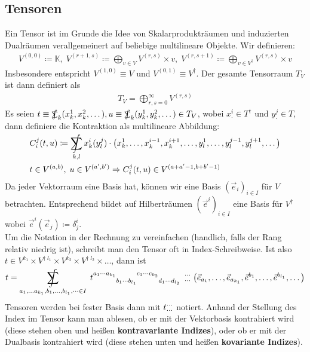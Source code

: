 \documentclass[12pt]{article}
\DeclareMathOperator*{\sumint}{%
	\mathchoice%
	{\ooalign{$\displaystyle\sum$\cr\hidewidth$\displaystyle\int$\hidewidth\cr}}
	{\ooalign{\raisebox{.14\height}{\scalebox{.7}{$\textstyle\sum$}}\cr\hidewidth$\textstyle\int$\hidewidth\cr}}
	{\ooalign{\raisebox{.2\height}{\scalebox{.6}{$\scriptstyle\sum$}}\cr$\scriptstyle\int$\cr}}
	{\ooalign{\raisebox{.2\height}{\scalebox{.6}{$\scriptstyle\sum$}}\cr$\scriptstyle\int$\cr}}
}
\begin{document}
\subsection{Tensoren}
Ein Tensor ist im Grunde die Idee von Skalarprodukträumen und induzierten Dualräumen verallgemeinert auf beliebige multilineare Objekte. Wir definieren:
\begin{align}
V^{(0, 0)} \coloneqq \mathbb K,\;  V^{(r+1, s)} \coloneqq \bigoplus_{v\in V} V^{(r, s)} \times v,\; V^{(r, s+1)} \coloneqq \bigoplus_{v\in V^\dagger} V^{(r, s)} \times v
\end{align}
Insbesondere entspricht $V^{(1, 0)} \equiv V$ und $V^{(0, 1)} \equiv V^\dagger$. Der gesamte Tensorraum $T_V$ ist dann definiert als
\begin{align}
T_V = \bigoplus_{r,s = 0}^\infty V^{(r, s)}
\end{align}
Es seien $t\equiv \sumint_k (x^1_k, x^2_k, \dots), u\equiv \sumint_k (y^1_k, y^2_k, \dots) \in T_V$, wobei $x^i_\cdot \in T^\dagger$ und $y^j_\cdot \in T$, dann definiere die Kontraktion als multilineare Abbildung:
\begin{align}
&C_i^j(t, u) \coloneqq \sumint_{k, l} x^i_k(y^j_l) \cdot \big(x^1_k, \dots, x^{i-1}_k, x^{i+1}_k, \dots, y^1_l, \dots, y^{j-1}_l, y^{j+1}_l, \dots\big)\\
&t \in V^{(a, b)},\; u \in V^{(a', b')} \Rightarrow C_i^j(t, u) \in V^{(a+a'-1, b+b'-1)}
\end{align}
Da jeder Vektorraum eine Basis hat, können wir eine Basis $(\vec e_i)_{i\in I}$ für $V$ betrachten. Entsprechend bildet auf Hilberträumen $(\vec e^i)_{i\in I}$ eine Basis für $V^\dagger$ wobei $\vec e^i(\vec e_j) \coloneqq \delta^i_j$.\\
Um die Notation in der Rechnung zu vereinfachen (handlich, falls der Rang relativ niedrig ist), schreibt man den Tensor oft in Index-Schreibweise. Ist also $t \in V^{k_1} \times V^{\dagger\; l_1} \times V^{k_2} \times V^{\dagger\; l_2} \times \dots$, dann ist
\begin{align}
t = \sumint_{a_1,\dots a_{k_1}, b_1,\dots, b_{l_1}, \dots \in I} \; t\indices{^{a_1\cdots a_{k_1}} _{b_1\cdots b_{l_1}} ^{c_1\cdots c_{k_2}} _{d_1\cdots d_{l_2}}} \phantom{0} \indices*{^\cdots_\cdots} \; \big( \vec e_{a_1}, \dots, \vec e_{a_{k_1}}, \vec e^{b_1}, \dots, \vec e^{b_{l_1}}, \dots \big)
\end{align}
Tensoren werden bei fester Basis dann mit $t\indices*{^\cdots_\cdots}$ notiert. Anhand der Stellung des Index im Tensor kann man ablesen, ob er mit der Vektorbasis kontrahiert wird (diese stehen oben und heißen \textbf{kontravariante Indizes}), oder ob er mit der Dualbasis kontrahiert wird (diese stehen unten und heißen \textbf{kovariante Indizes}).\\
\end{document}
